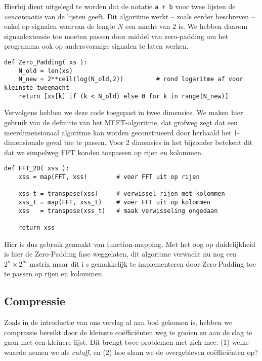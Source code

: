 Hierbij dient uitgelegd te worden dat de notatie \texttt{a + b} voor twee lijsten de \emph{concatenatie} van de lijsten geeft.
Dit algoritme werkt -- zoals eerder beschreven -- enkel op signalen waarvan de lengte
$N$ een macht van $2$ is. We hebben daarom signaalextensie toe moeten passen door middel van zero-padding
om het programma ook op andersvormige signalen te laten werken.

\begin{lstlisting}[caption={Zero-padding algoritme in Python, voegt nullen toe tot een tweemacht is bereikt}]
def Zero_Padding( xs ):
    N_old = len(xs)
    N_new = 2**ceil(log(N_old,2))         # rond logaritme af voor kleinste tweemacht
    return [xs[k] if (k < N_old) else 0 for k in range(N_new)]
\end{lstlisting}

Vervolgens hebben we deze code toegepast in twee dimensies. We maken hier gebruik van de definitie van het
MFFT-algoritme, dat grofweg zegt dat een meerdimensionaal algoritme kan worden geconstrueerd door herhaald 
het 1-dimensionale geval toe te passen. Voor 2 dimensies in het bijzonder betekent dit dat we simpelweg 
FFT konden toepassen op rijen en kolommen.

\begin{lstlisting}[caption=2-Dimensionaal FFT algoritme]
def FFT_2D( xss ):
    xss = map(FFT, xss)        # voer FFT uit op rijen

    xss_t = transpose(xss)     # verwissel rijen met kolommen
    xss_t = map(FFT, xss_t)    # voer FFT uit op kolommen
    xss   = transpose(xss_t)   # maak verwisseling ongedaan 

    return xss
\end{lstlisting}
Hier is dus gebruik gemaakt van function-mapping.
Met het oog op duidelijkheid is hier de Zero-Padding fase weggelaten, 
dit algoritme verwacht nu nog een $2^n \times 2^m$ matrix maar dit i
s gemakkelijk te implementeren door Zero-Padding toe te passen op rijen en kolommen.

\subsection{Compressie}
Zoals in de introductie van ons verslag al aan bod gekomen is, hebben we compressie bereikt door de kleinste 
co\"effici\"enten weg te gooien en aan de slag te gaan met een kleinere lijst. 
Dit brengt twee problemen met zich mee: (1) welke waarde nemen we als \emph{cutoff}, 
en (2) hoe slaan we de overgebleven co\"effici\"enten op?
